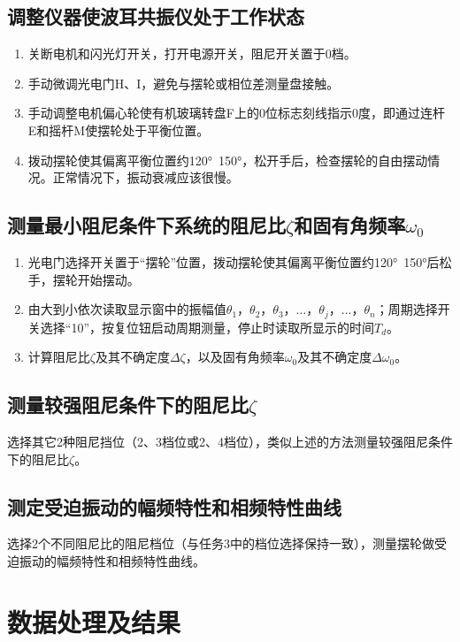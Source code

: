 \documentclass[12pt,a4paper]{amsart}
\begin{document}
\subsection{调整仪器使波耳共振仪处于工作状态}
\begin{enumerate}
    \item 关断电机和闪光灯开关，打开电源开关，阻尼开关置于0档。
    \item 手动微调光电门H、I，避免与摆轮或相位差测量盘接触。
    \item 手动调整电机偏心轮使有机玻璃转盘F上的0位标志刻线指示0度，即通过连杆E和摇杆M使摆轮处于平衡位置。
    \item 拨动摆轮使其偏离平衡位置约120°~150°，松开手后，检查摆轮的自由摆动情况。正常情况下，振动衰减应该很慢。
\end{enumerate}

\subsection{测量最小阻尼条件下系统的阻尼比$\zeta$和固有角频率$\omega_0$}
\begin{enumerate}
    \item 光电门选择开关置于“摆轮”位置，拨动摆轮使其偏离平衡位置约120°~150°后松手，摆轮开始摆动。
    \item 由大到小依次读取显示窗中的振幅值$\theta_1$，$\theta_2$，$\theta_3$，$\dots$，$\theta_j$，$\dots$，$\theta_n$；周期选择开关选择“10”，按复位钮启动周期测量，停止时读取所显示的时间$T_d$。
    \item 计算阻尼比$\zeta$及其不确定度$\Delta\zeta$，以及固有角频率$\omega_0$及其不确定度$\Delta\omega_0$。
\end{enumerate}

\subsection{测量较强阻尼条件下的阻尼比$\zeta$}
选择其它2种阻尼挡位（2、3档位或2、4档位），类似上述的方法测量较强阻尼条件下的阻尼比$\zeta$。

\subsection{测定受迫振动的幅频特性和相频特性曲线}
选择2个不同阻尼比的阻尼档位（与任务3中的档位选择保持一致），测量摆轮做受迫振动的幅频特性和相频特性曲线。

\section{数据处理及结果}
\end{document}
